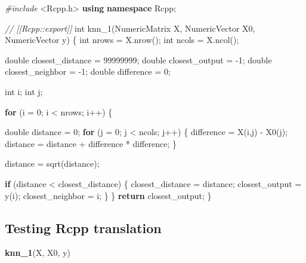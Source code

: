 \documentclass[]{article}
\newenvironment{Shaded}{\begin{snugshade}}{\end{snugshade}}
\newcommand{\CommentTok}[1]{\textcolor[rgb]{0.56,0.35,0.01}{\textit{#1}}}
\newcommand{\ControlFlowTok}[1]{\textcolor[rgb]{0.13,0.29,0.53}{\textbf{#1}}}
\newcommand{\DataTypeTok}[1]{\textcolor[rgb]{0.13,0.29,0.53}{#1}}
\newcommand{\DecValTok}[1]{\textcolor[rgb]{0.00,0.00,0.81}{#1}}
\newcommand{\ImportTok}[1]{#1}
\newcommand{\KeywordTok}[1]{\textcolor[rgb]{0.13,0.29,0.53}{\textbf{#1}}}
\newcommand{\NormalTok}[1]{#1}
\newcommand{\PreprocessorTok}[1]{\textcolor[rgb]{0.56,0.35,0.01}{\textit{#1}}}
\begin{document}
\begin{Shaded}
\begin{Highlighting}[]
\PreprocessorTok{#include }\ImportTok{<Rcpp.h>}
\KeywordTok{using} \KeywordTok{namespace}\NormalTok{ Rcpp;}

\CommentTok{// [[Rcpp::export]]}
\DataTypeTok{int}\NormalTok{ knn_1(NumericMatrix X, NumericVector X0, NumericVector y) \{}
    \DataTypeTok{int}\NormalTok{ nrows = X.nrow();}
    \DataTypeTok{int}\NormalTok{ ncols = X.ncol();}

    \DataTypeTok{double}\NormalTok{ closest_distance = }\DecValTok{99999999}\NormalTok{;}
    \DataTypeTok{double}\NormalTok{ closest_output = -}\DecValTok{1}\NormalTok{;}
    \DataTypeTok{double}\NormalTok{ closest_neighbor = -}\DecValTok{1}\NormalTok{;}
    \DataTypeTok{double}\NormalTok{ difference = }\DecValTok{0}\NormalTok{;}

    \DataTypeTok{int}\NormalTok{ i;}
    \DataTypeTok{int}\NormalTok{ j;}

    \ControlFlowTok{for}\NormalTok{ (i = }\DecValTok{0}\NormalTok{; i < nrows; i++) \{}
        
        \DataTypeTok{double}\NormalTok{ distance = }\DecValTok{0}\NormalTok{;}
        \ControlFlowTok{for}\NormalTok{ (j = }\DecValTok{0}\NormalTok{; j < ncols; j++) \{}
\NormalTok{            difference = X(i,j) - X0(j);}
\NormalTok{            distance = distance + difference * difference;}
\NormalTok{        \}}

\NormalTok{        distance = sqrt(distance);}

        \ControlFlowTok{if}\NormalTok{ (distance < closest_distance) \{}
\NormalTok{            closest_distance = distance;}
\NormalTok{            closest_output = y(i);}
\NormalTok{            closest_neighbor = i;}
\NormalTok{        \}}
\NormalTok{    \}}
    \ControlFlowTok{return}\NormalTok{ closest_output;}
\NormalTok{\}}
\end{Highlighting}
\end{Shaded}

\hypertarget{testing-rcpp-translation}{%
\subsection{Testing Rcpp translation}\label{testing-rcpp-translation}}

\begin{Shaded}
\begin{Highlighting}[]
\KeywordTok{knn_1}\NormalTok{(X, X0, y)}
\end{Highlighting}
\end{Shaded}
\end{document}
